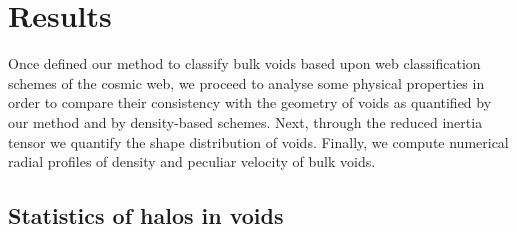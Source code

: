 \documentclass[a4,useAMS,usenatbib,usegraphicx]{latex/mn2e}
\begin{document}
 




\section{Results}
\label{sec:results}


Once defined our method to classify bulk voids based upon web 
classification schemes of the cosmic web, we proceed to analyse some 
physical properties in order to compare their consistency with the 
geometry of voids as quantified by our method and by density-based schemes.
Next, through the reduced inertia tensor we quantify the shape distribution 
of voids. Finally, we compute numerical radial profiles of density and 
peculiar velocity of bulk voids.


\subsection{Statistics of halos in voids}
\label{subsec:shape_voids}
\end{document}

